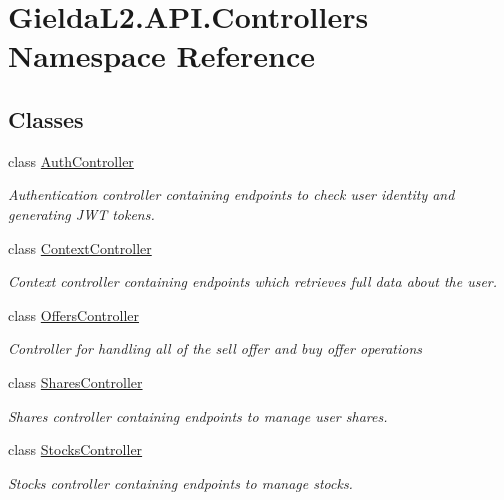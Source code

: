 \hypertarget{namespace_gielda_l2_1_1_a_p_i_1_1_controllers}{}\section{Gielda\+L2.\+A\+P\+I.\+Controllers Namespace Reference}
\label{namespace_gielda_l2_1_1_a_p_i_1_1_controllers}
\subsection*{Classes}
\begin{DoxyCompactItemize}
\item 
class \mbox{\hyperlink{class_gielda_l2_1_1_a_p_i_1_1_controllers_1_1_auth_controller}{Auth\+Controller}}
\begin{DoxyCompactList}\small\item\em Authentication controller containing endpoints to check user identity and generating J\+WT tokens. \end{DoxyCompactList}\item 
class \mbox{\hyperlink{class_gielda_l2_1_1_a_p_i_1_1_controllers_1_1_context_controller}{Context\+Controller}}
\begin{DoxyCompactList}\small\item\em Context controller containing endpoints which retrieves full data about the user. \end{DoxyCompactList}\item 
class \mbox{\hyperlink{class_gielda_l2_1_1_a_p_i_1_1_controllers_1_1_offers_controller}{Offers\+Controller}}
\begin{DoxyCompactList}\small\item\em Controller for handling all of the sell offer and buy offer operations \end{DoxyCompactList}\item 
class \mbox{\hyperlink{class_gielda_l2_1_1_a_p_i_1_1_controllers_1_1_shares_controller}{Shares\+Controller}}
\begin{DoxyCompactList}\small\item\em Shares controller containing endpoints to manage user shares. \end{DoxyCompactList}\item 
class \mbox{\hyperlink{class_gielda_l2_1_1_a_p_i_1_1_controllers_1_1_stocks_controller}{Stocks\+Controller}}
\begin{DoxyCompactList}\small\item\em Stocks controller containing endpoints to manage stocks. \end{DoxyCompactList}\item 

\end{DoxyCompactItemize}
